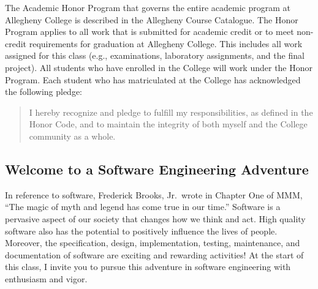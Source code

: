 The Academic Honor Program that governs the entire academic program at Allegheny College is described in the Allegheny
Course Catalogue.  The Honor Program applies to all work that is submitted for academic credit or to meet non-credit
requirements for graduation at Allegheny College.  This includes all work assigned for this class (e.g., examinations,
laboratory assignments, and the final project).  All students who have enrolled in the College will work under the Honor
Program.  Each student who has matriculated at the College has acknowledged the following pledge:

\vspace*{-.1in}
\begin{quote}
I hereby recognize and pledge to fulfill my responsibilities, as defined in the Honor Code, and to maintain the
integrity of both myself and the College community as a whole.
\end{quote}
\vspace*{-.15in}

\subsection*{Welcome to a Software Engineering Adventure}

In reference to software, Frederick Brooks, Jr.\ wrote in Chapter One of MMM, ``The magic of myth and legend has come true
in our time.'' Software is a pervasive aspect of our society that changes how we think and act.  High quality software
also has the potential to positively influence the lives of people. Moreover, the specification, design, implementation,
testing, maintenance, and documentation of software are exciting and rewarding activities!  At the start of this class,
I invite you to pursue this adventure in software engineering with enthusiasm and vigor.


